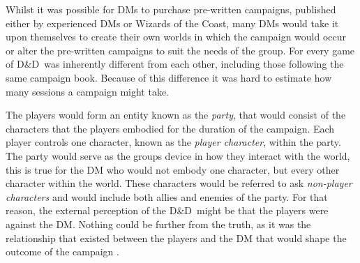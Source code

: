 \documentclass[final]{cmpreport}
\newcommand{\WotC}{Wizards of the Coast}
\newcommand{\dnd}{D\&D}
\begin{document}
			Whilst it was possible for DMs to purchase pre-written campaigns, published either by experienced DMs or \WotC, many DMs would take it upon themselves to create their own worlds in which the campaign would occur or alter the pre-written campaigns to suit the needs of the group. For every game of \dnd \ was inherently different from each other, including those following the same campaign book. Because of this difference it was hard to estimate how many sessions a campaign might take. 
			
			The players would form an entity known as the \emph{party}, that would consist of the characters that the players embodied for the duration of the campaign. Each player controls one character, known as the \emph{player character}, within the party. The party would serve as the groups device in how they interact with the world, this is true for the DM who would not embody one character, but every other character within the world. These characters would be referred to ask \emph{non-player characters} and would include both allies and enemies of the party. For that reason, the external perception of the \dnd \ might be that the players were against the DM. Nothing could be further from the truth, as it was the relationship that existed between the players and the DM that would shape the outcome of the campaign \citep{DnDPeople}.
			
\end{document}
